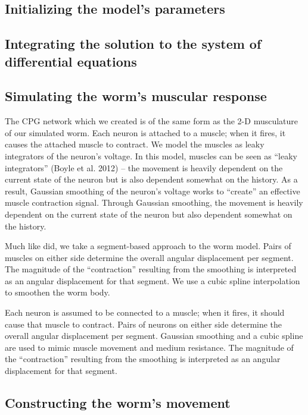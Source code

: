 \documentclass[
    11pt,
]{article}
\begin{document}
\subsection{Initializing the model's parameters}


\subsection{Integrating the solution to the system of differential equations}

\subsection{Simulating the worm's muscular response}

The CPG network which we created is of the same form as the 2-D musculature of our simulated worm.  Each neuron is attached to a muscle; when it fires, it causes the attached muscle to contract.  We model the muscles as leaky integrators of the neuron's voltage. In this model, muscles can be seen as “leaky integrators” (Boyle et al. 2012) – the movement is heavily dependent on the current state of the neuron but is also dependent somewhat on the history. As a result, Gaussian smoothing of the neuron's voltage works to ``create'' an effective muscle contraction signal.  Through Gaussian smoothing, the movement is heavily dependent on the current state of the neuron but also dependent somewhat on the history.

Much like \citet{izquierdo2018} did, we take a segment-based approach to the worm model.  Pairs of muscles on either side determine the overall angular displacement per segment.  The magnitude of the “contraction” resulting from the smoothing is interpreted as an angular displacement for that segment.  We use a cubic spline interpolation to smoothen the worm body.

Each neuron is assumed to be connected to a muscle; when it fires, it should cause that muscle to contract.
Pairs of neurons on either side determine the overall angular displacement per segment.
Gaussian smoothing and a cubic spline are used to mimic muscle movement and medium resistance.
The magnitude of the “contraction” resulting from the smoothing is interpreted as an angular displacement for that segment.

\subsection{Constructing the worm's movement}
\end{document}
